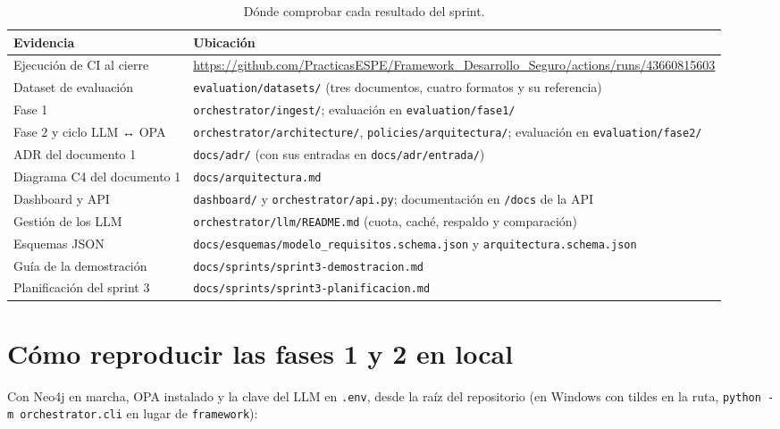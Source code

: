 \documentclass[11pt,a4paper]{report}
\begin{document}
\begin{table}[H]
\centering
\caption{Dónde comprobar cada resultado del sprint.}
\begin{tabularx}{\textwidth}{@{}P{4.0cm}>{\raggedright\arraybackslash\small}X@{}}
\toprule
\textbf{Evidencia} & \textbf{Ubicación}\\
\midrule
Ejecución de CI al cierre & \url{https://github.com/PracticasESPE/Framework_Desarrollo_Seguro/actions/runs/43660815603}\\
Dataset de evaluación & \texttt{evaluation/datasets/} (tres documentos, cuatro formatos y su referencia)\\
Fase 1 & \texttt{orchestrator/ingest/}; evaluación en \texttt{evaluation/fase1/}\\
Fase 2 y ciclo LLM ↔ OPA & \texttt{orchestrator/architecture/}, \texttt{policies/arquitectura/}; evaluación en \texttt{evaluation/fase2/}\\
ADR del documento 1 & \texttt{docs/adr/} (con sus entradas en \texttt{docs/adr/entrada/})\\
Diagrama C4 del documento 1 & \texttt{docs/arquitectura.md}\\
Dashboard y API & \texttt{dashboard/} y \texttt{orchestrator/api.py}; documentación en \texttt{/docs} de la API\\
Gestión de los LLM & \texttt{orchestrator/llm/README.md} (cuota, caché, respaldo y comparación)\\
Esquemas JSON & \texttt{docs/esquemas/modelo\_requisitos.schema.json} y \texttt{arquitectura.schema.json}\\
Guía de la demostración & \texttt{docs/sprints/sprint3-demostracion.md}\\
Planificación del sprint 3 & \texttt{docs/sprints/sprint3-planificacion.md}\\
\bottomrule
\end{tabularx}
\end{table}

\section*{Cómo reproducir las fases 1 y 2 en local}
Con Neo4j en marcha, OPA instalado y la clave del LLM en \texttt{.env}, desde la raíz del
repositorio (en Windows con tildes en la ruta, \texttt{python -m orchestrator.cli} en lugar de
\texttt{framework}):
\end{document}
